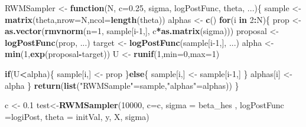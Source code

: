 \documentclass[]{article}
\newenvironment{Shaded}{\begin{snugshade}}{\end{snugshade}}
\newcommand{\ControlFlowTok}[1]{\textcolor[rgb]{0.13,0.29,0.53}{\textbf{#1}}}
\newcommand{\DataTypeTok}[1]{\textcolor[rgb]{0.13,0.29,0.53}{#1}}
\newcommand{\DecValTok}[1]{\textcolor[rgb]{0.00,0.00,0.81}{#1}}
\newcommand{\FloatTok}[1]{\textcolor[rgb]{0.00,0.00,0.81}{#1}}
\newcommand{\KeywordTok}[1]{\textcolor[rgb]{0.13,0.29,0.53}{\textbf{#1}}}
\newcommand{\NormalTok}[1]{#1}
\newcommand{\OperatorTok}[1]{\textcolor[rgb]{0.81,0.36,0.00}{\textbf{#1}}}
\newcommand{\StringTok}[1]{\textcolor[rgb]{0.31,0.60,0.02}{#1}}
\begin{document}
\begin{Shaded}
\begin{Highlighting}[]
\NormalTok{RWMSampler \textless{}{-}}\StringTok{ }\ControlFlowTok{function}\NormalTok{(N, }\DataTypeTok{c=}\FloatTok{0.25}\NormalTok{, sigma, logPostFunc, theta, ...)\{}
\NormalTok{  sample \textless{}{-}}\StringTok{ }\KeywordTok{matrix}\NormalTok{(theta,}\DataTypeTok{nrow=}\NormalTok{N,}\DataTypeTok{ncol=}\KeywordTok{length}\NormalTok{(theta))}
\NormalTok{  alphas \textless{}{-}}\StringTok{ }\KeywordTok{c}\NormalTok{()}
  \ControlFlowTok{for}\NormalTok{(i }\ControlFlowTok{in} \DecValTok{2}\OperatorTok{:}\NormalTok{N)\{}
\NormalTok{    prop \textless{}{-}}\StringTok{ }\KeywordTok{as.vector}\NormalTok{(}\KeywordTok{rmvnorm}\NormalTok{(}\DataTypeTok{n=}\DecValTok{1}\NormalTok{, sample[i}\DecValTok{{-}1}\NormalTok{,], c}\OperatorTok{*}\KeywordTok{as.matrix}\NormalTok{(sigma)))}
\NormalTok{    proposal \textless{}{-}}\StringTok{ }\KeywordTok{logPostFunc}\NormalTok{(prop, ...)}
\NormalTok{    target \textless{}{-}}\StringTok{ }\KeywordTok{logPostFunc}\NormalTok{(sample[i}\DecValTok{{-}1}\NormalTok{,], ...)}
\NormalTok{    alpha \textless{}{-}}\StringTok{ }\KeywordTok{min}\NormalTok{(}\DecValTok{1}\NormalTok{,}\KeywordTok{exp}\NormalTok{(proposal}\OperatorTok{{-}}\NormalTok{target))}
\NormalTok{    U \textless{}{-}}\StringTok{ }\KeywordTok{runif}\NormalTok{(}\DecValTok{1}\NormalTok{,}\DataTypeTok{min=}\DecValTok{0}\NormalTok{,}\DataTypeTok{max=}\DecValTok{1}\NormalTok{)}

    \ControlFlowTok{if}\NormalTok{(U}\OperatorTok{\textless{}}\NormalTok{alpha)\{}
\NormalTok{      sample[i,] \textless{}{-}}\StringTok{ }\NormalTok{prop}
\NormalTok{    \}}\ControlFlowTok{else}\NormalTok{\{}
\NormalTok{      sample[i,] \textless{}{-}}\StringTok{ }\NormalTok{sample[i}\DecValTok{{-}1}\NormalTok{,]}
\NormalTok{    \}}
\NormalTok{    alphas[i] \textless{}{-}}\StringTok{ }\NormalTok{alpha}
\NormalTok{  \}}
  \KeywordTok{return}\NormalTok{(}\KeywordTok{list}\NormalTok{(}\StringTok{"RWMSample"}\NormalTok{=sample,}\StringTok{"alphas"}\NormalTok{=alphas))}
\NormalTok{\}}

\NormalTok{c \textless{}{-}}\StringTok{ }\FloatTok{0.1}
\NormalTok{test\textless{}{-}}\KeywordTok{RWMSampler}\NormalTok{(}\DecValTok{10000}\NormalTok{, }\DataTypeTok{c=}\NormalTok{c, }\DataTypeTok{sigma =}\NormalTok{ beta\_hes , }\DataTypeTok{logPostFunc =}\NormalTok{logiPost, }\DataTypeTok{theta =}\NormalTok{ initVal, y, X, sigma)}


\end{Highlighting}
\end{Shaded}
\end{document}
